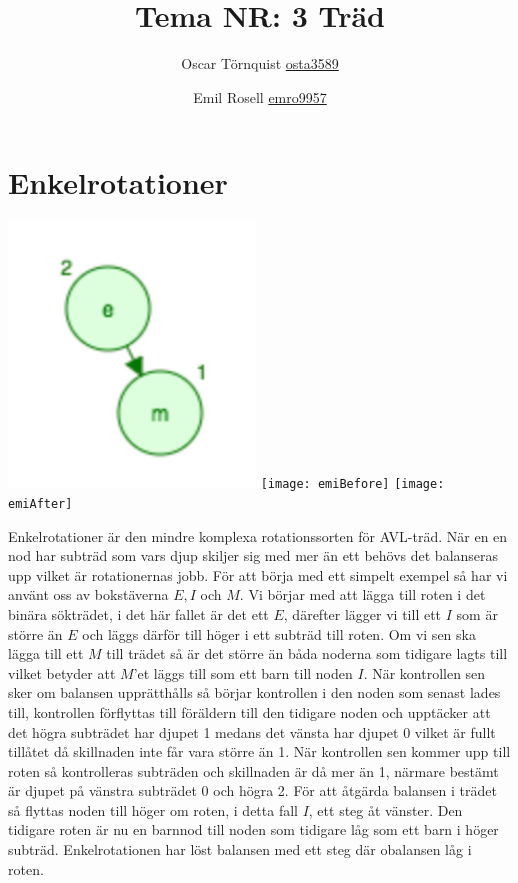 \documentclass[a5paper,10pt,oneside]{article}
\title{Tema NR: 3 Träd}
\author{Oscar Törnquist \url{osta3589} \and Emil Rosell \url{emro9957}}
\begin{document}
\maketitle

\section*{Enkelrotationer}

\includegraphics[scale=0.4]{em}
\texttt{[image: emiBefore]}
\texttt{[image: emiAfter]}

Enkelrotationer är den mindre komplexa rotationssorten för AVL-träd. När en en nod har subträd som vars djup skiljer sig med mer än ett behövs det balanseras upp vilket är rotationernas jobb. För att börja med ett simpelt exempel så har vi använt oss av bokstäverna $E, I $ och $M$. Vi börjar med att lägga till roten i det binära sökträdet, i det här fallet är det ett $E$, därefter lägger vi till ett $I$ som är större än $E$ och läggs därför till höger i ett subträd till roten. Om vi sen ska lägga till ett $M$ till trädet så är det större än båda noderna som tidigare lagts till vilket betyder att $M$'et läggs till som ett barn till noden $I$. När kontrollen sen sker om balansen upprätthålls så börjar kontrollen i den noden som senast lades till, kontrollen förflyttas till föräldern till den tidigare noden och upptäcker att det högra subträdet har djupet 1 medans det vänsta har djupet 0 vilket är fullt tillåtet då skillnaden inte får vara större än 1. När kontrollen sen kommer upp till roten så kontrolleras subträden och skillnaden är då mer än 1, närmare bestämt är djupet på vänstra subträdet 0 och högra 2. För att åtgärda balansen i trädet så flyttas noden till höger om roten, i detta fall $I$, ett steg åt vänster. Den tidigare roten är nu en barnnod till noden som tidigare låg som ett barn i höger subträd. Enkelrotationen har löst balansen med ett steg där obalansen låg i roten. 
\end{document}
